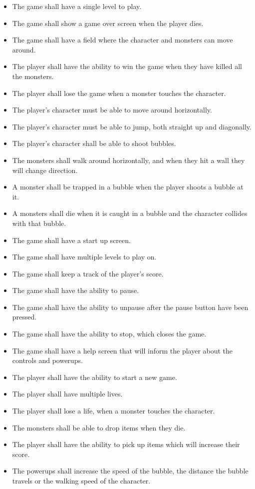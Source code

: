 \begin{itemize}
    \item The game shall have a single level to play.
    \item The game shall show a game over screen when the player dies.
  \item The game shall have a field where the character and monsters can move around.
    \item The player shall have the ability to win the game when they have killed all the monsters.
  \item The player shall lose the game when a monster touches the character.
    \item The player's character must be able to move around horizontally.
    \item The player's character must be able to jump, both straight up and diagonally.
    \item The player's character shall be able to shoot bubbles.
    \item The monsters shall walk around horizontally, and when they hit a wall they will change direction. 
  \item A monster shall be trapped in a bubble when the player shoots a bubble at it.
  \item A monsters shall die when it is caught in a bubble and the character collides with that bubble.
   \item The game shall have a start up screen.
   \item The game shall have multiple levels to play on.
   \item The game shall keep a track of the player's score.
   \item The game shall have the ability to pause.
   \item The game shall have the ability to unpause after the pause button have been pressed.
   \item The game shall have the ability to stop, which closes the game.
   \item The game shall have a help screen that will inform the player about the controls and powerups.
   \item The player shall have the ability to start a new game.
   \item The player shall have multiple lives.
   \item The player shall lose a life, when a monster touches the character. 
   \item The monsters shall be able to drop items when they die.
   \item The player shall have the ability to pick up items which will increase their score.
   \item The powerups shall increase the speed of the bubble, the distance the bubble travels or the walking speed of the character.\\\\\\
\end{itemize}

